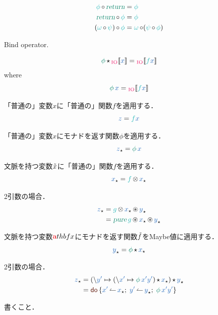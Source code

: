 \documentclass[a5paper,twoside,fleqn,draft]{jsbook}
\begin{document}
\begin{align}
\hFunc{\phi}\hMonadicCompose\hReturn&=\hFunc{\phi}\\
\hReturn\hMonadicCompose\hFunc{\phi}&=\hFunc{\phi}\\
(\hFunc{\omega}\hMonadicCompose\hFunc{\psi})\hMonadicCompose\hFunc{\phi}&=\hFunc{\omega}\hMonadicCompose(\hFunc{\psi}\hMonadicCompose\hFunc{\phi})
\end{align}

Bind operator.

\begin{equation}
  \hAction{\phi}\hMonadicBind{}\hIOWith{\hVar{x}}
    =\hIOWith{\hFunc{f}\hVar{x}}
\end{equation}
where
\begin{equation}
  \hAction{\phi}\hVar{x}=\hIOWith{\hFunc{f}\hVar{x}}
\end{equation}

\separator

「普通の」変数$x$に「普通の」関数$f$を適用する．
$$
\hVar{z}=\hFunc{f}\hVar{x}
$$

「普通の」変数$x$にモナドを返す関数$\phi$を適用する．
$$
\hAnyContextVar{z}=\hAction{\phi}\hVar{x}
$$

文脈を持つ変数$\Tilde{x}$に「普通の」関数$f$を適用する．
$$
\hAnyContextVar{x}=\hFunc{f}\hFunctorMap\hAnyContextVar{x}
$$

2引数の場合．
\begin{align*}
\hAnyContextVar{z}
&=\hFunc{g}\hFunctorMap\hAnyContextVar{x}\hApplicativeMap\hAnyContextVar{y}\\
&=\hPure\hFunc{g}\hApplicativeMap\hAnyContextVar{x}\hApplicativeMap\hAnyContextVar{y}
\end{align*}

文脈を持つ変数$\hTypeName{a}thbf{x}$にモナドを返す関数$\Tilde{f}$をMaybe値に適用する．
$$
\hAnyContextVar{y}=\hAction{\phi}\hMonadicBind\hAnyContextVar{x}
$$

2引数の場合．
\begin{align*}
\hAnyContextVar{z}
&=(\hLambdaSyntax{\hVar{y'}}{(\hLambdaSyntax{\hVar{x'}}{\hAction{\phi}\hVar{x'}\hVar{y'}})\hMonadicBind\hAnyContextVar{x}})\hMonadicBind\hAnyContextVar{y}\\
&=\hDoSyntax{\hVar{x'}\hDoArrow\hAnyContextVar{x};\;
\hVar{y'}\hDoArrow\hAnyContextVar{y};\;
\hAction{\phi}\hVar{x'}\hVar{y'}}
\end{align*}

\separator

書くこと．
\end{document}
